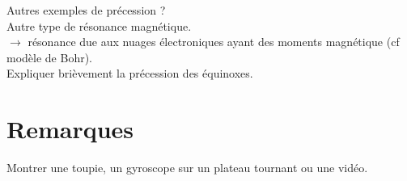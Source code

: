 \documentclass[12pt,prb,aps,epsf]{article}
\begin{document}
Autres exemples de précession ?\\

Autre type de résonance magnétique.\\
$\rightarrow$ résonance due aux nuages électroniques ayant des moments magnétique (cf modèle de Bohr).\\

Expliquer brièvement la précession des équinoxes.

\section*{Remarques}
Montrer une toupie, un gyroscope sur un plateau tournant ou une vidéo.
\end{document}
